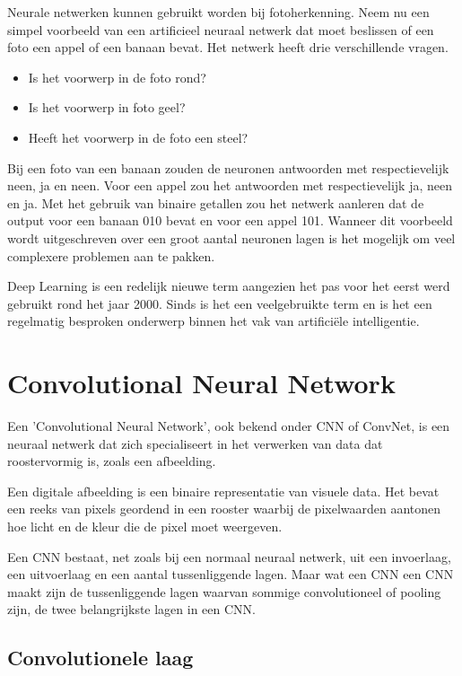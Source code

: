 Neurale netwerken kunnen gebruikt worden bij fotoherkenning.
Neem nu een simpel voorbeeld van een artificieel neuraal netwerk dat moet beslissen of een foto een appel of een banaan bevat.
Het netwerk heeft drie verschillende vragen.


\begin{itemize}
	\item Is het voorwerp in de foto rond?
	\item Is het voorwerp in foto geel?
	\item Heeft het voorwerp in de foto een steel?
\end{itemize}

Bij een foto van een banaan zouden de neuronen antwoorden met respectievelijk neen, ja en neen. Voor een appel zou het antwoorden met respectievelijk ja, neen en ja. Met het gebruik van binaire getallen zou het netwerk aanleren dat de output voor een banaan 010 bevat en voor een appel 101.
Wanneer dit voorbeeld wordt uitgeschreven over een groot aantal neuronen lagen is het mogelijk om veel complexere problemen aan te pakken.

Deep Learning is een redelijk nieuwe term aangezien het pas voor het eerst werd gebruikt rond het jaar 2000. Sinds is het een veelgebruikte term en is het een regelmatig besproken onderwerp binnen het vak van artificiële intelligentie. \autocite{Goff2018}


\section{Convolutional Neural Network}

Een 'Convolutional Neural Network', ook bekend onder CNN of ConvNet, is een neuraal netwerk dat zich specialiseert in het verwerken van data dat roostervormig is, zoals een afbeelding. 


Een digitale afbeelding is een binaire representatie van visuele data. Het bevat een reeks van pixels geordend in een rooster waarbij de pixelwaarden aantonen hoe licht en de kleur die de pixel moet weergeven.

Een CNN bestaat, net zoals bij een normaal neuraal netwerk, uit een invoerlaag, een uitvoerlaag en een aantal tussenliggende lagen.
Maar wat een CNN een CNN maakt zijn de tussenliggende lagen waarvan sommige convolutioneel of pooling zijn, de twee belangrijkste lagen in een CNN.

\subsection{Convolutionele laag}




